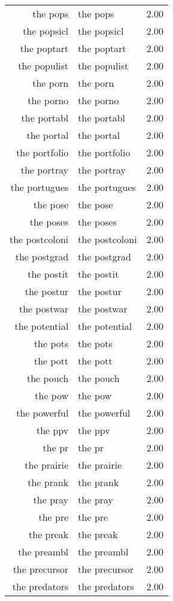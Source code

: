 \begin{table}[ht]
\begin{tabular}{rlr}
  the pops & the pops & 2.00 \\ 
  the popsicl & the popsicl & 2.00 \\ 
  the poptart & the poptart & 2.00 \\ 
  the populist & the populist & 2.00 \\ 
  the porn & the porn & 2.00 \\ 
  the porno & the porno & 2.00 \\ 
  the portabl & the portabl & 2.00 \\ 
  the portal & the portal & 2.00 \\ 
  the portfolio & the portfolio & 2.00 \\ 
  the portray & the portray & 2.00 \\ 
  the portugues & the portugues & 2.00 \\ 
  the pose & the pose & 2.00 \\ 
  the poses & the poses & 2.00 \\ 
  the postcoloni & the postcoloni & 2.00 \\ 
  the postgrad & the postgrad & 2.00 \\ 
  the postit & the postit & 2.00 \\ 
  the postur & the postur & 2.00 \\ 
  the postwar & the postwar & 2.00 \\ 
  the potential & the potential & 2.00 \\ 
  the pots & the pots & 2.00 \\ 
  the pott & the pott & 2.00 \\ 
  the pouch & the pouch & 2.00 \\ 
  the pow & the pow & 2.00 \\ 
  the powerful & the powerful & 2.00 \\ 
  the ppv & the ppv & 2.00 \\ 
  the pr & the pr & 2.00 \\ 
  the prairie & the prairie & 2.00 \\ 
  the prank & the prank & 2.00 \\ 
  the pray & the pray & 2.00 \\ 
  the pre & the pre & 2.00 \\ 
  the preak & the preak & 2.00 \\ 
  the preambl & the preambl & 2.00 \\ 
  the precursor & the precursor & 2.00 \\ 
  the predators & the predators & 2.00 \\ 

\end{tabular}
\end{table}

